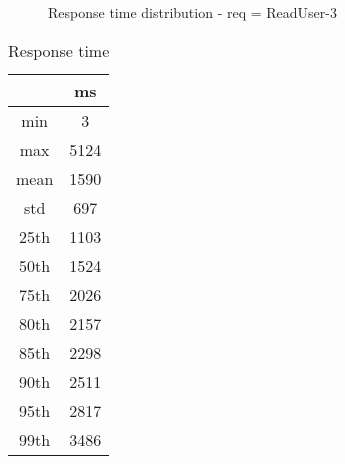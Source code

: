 \begin{minipage}{0.75\linewidth}
\begin{figure}[h]
\begin{adjustbox}{max width=1.0\linewidth, keepaspectratio}
  \end{adjustbox}
  \caption{Response time distribution - req = ReadUser-3}
\end{figure}
\end{minipage}\hfill\begin{minipage}{0.18\linewidth}
\begin{table}[h]
\begin{tabular}{|cc|}
\hline
\textbf{} & \textbf{ms}\\ \hline
 \Xhline{0.005\arrayrulewidth}
min & 3\\
 \Xhline{0.005\arrayrulewidth}
max & 5124\\
 \Xhline{0.005\arrayrulewidth}
mean & 1590\\
 \Xhline{0.005\arrayrulewidth}
std & 697\\
\hline
\hline
 \Xhline{0.005\arrayrulewidth}
25th & 1103\\
 \Xhline{0.005\arrayrulewidth}
50th & 1524\\
 \Xhline{0.005\arrayrulewidth}
75th & 2026\\
 \Xhline{0.005\arrayrulewidth}
80th & 2157\\
 \Xhline{0.005\arrayrulewidth}
85th & 2298\\
 \Xhline{0.005\arrayrulewidth}
90th & 2511\\
 \Xhline{0.005\arrayrulewidth}
95th & 2817\\
 \Xhline{0.005\arrayrulewidth}
99th & 3486\\
\hline
\end{tabular}
\caption{Response time}
\end{table}
\end{minipage}\hfill
